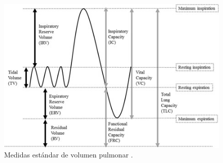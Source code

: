 \documentclass[12pt]{article}
\begin{document}
\begin{figure}[ht]
\centering
\includegraphics[scale=0.6]{imag/volumeslung.jpeg}
\caption{Medidas estándar de volumen pulmonar \cite{18}. }
\label{3}
\end{figure}
\FloatBarrier









\end{document}
